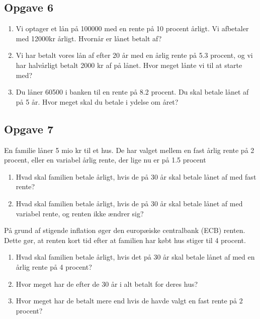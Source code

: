 \subsection*{Opgave 6}
\begin{enumerate}[label = \roman*)]
	\item Vi optager et lån på 100000 med en rente på 10 procent årligt. Vi afbetaler med 12000kr årligt. Hvornår er lånet betalt af?
	\item Vi har betalt vores lån af efter 20 år med en årlig rente på 5.3 procent, og vi har halvårligt betalt 2000 kr af på lånet. Hvor meget lånte vi til at starte med?
	\item Du låner 60500 i banken til en rente på 8.2 procent. Du skal betale lånet af på 5 år. Hvor meget skal du betale i ydelse om året?
\end{enumerate}



\subsection*{Opgave 7}
En familie låner 5 mio kr til et hus. De har valget mellem en fast årlig rente på 2 procent, eller en variabel årlig rente, der lige nu er på 1.5 procent
\begin{enumerate}[label=\roman*)]
	\item Hvad skal familien betale årligt, hvis de på 30 år skal betale lånet af med fast rente?
	\item Hvad skal familien betale årligt, hvis de på 30 år skal betale lånet af med variabel rente, og renten ikke ændrer sig?
\end{enumerate}
På grund af stigende inflation øger den europæiske centralbank (ECB) renten. Dette gør, at renten kort tid efter at familien har købt hus stiger til 4 procent.
\begin{enumerate}[label=\roman*)]
	\item Hvad skal familien betale årligt, hvis det på 30 år skal betale lånet af med en årlig rente på 4 procent?
	\item Hvor meget har de efter de 30 år i alt betalt for deres hus?
	\item Hvor meget har de betalt mere end hvis de havde valgt en fast rente på 2 procent?
\end{enumerate}
